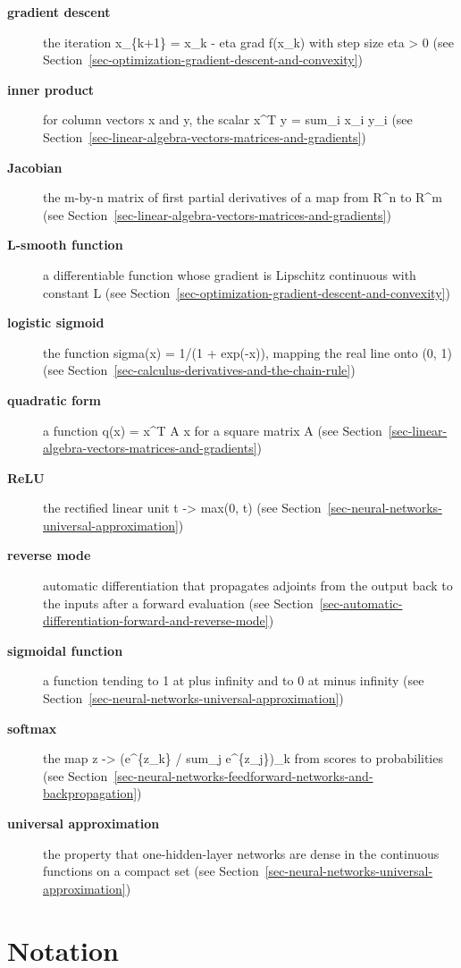 \documentclass[
  english,
  11pt,
  a4paper,
  twoside,
  open=any,
  numbers=noenddot]{scrbook}
\theoremstyle{plain}
\theoremstyle{plain}
\theoremstyle{plain}
\theoremstyle{definition}
\theoremstyle{definition}
\theoremstyle{definition}
\theoremstyle{remark}
\begin{document}
\begin{description}
\item[\textbf{gradient descent}]
the iteration x\_\{k+1\} = x\_k - eta grad f(x\_k) with step size eta
\textgreater{} 0 (see
Section~\ref{sec-optimization-gradient-descent-and-convexity})
\item[\textbf{inner product}]
for column vectors x and y, the scalar x\^{}T y = sum\_i x\_i y\_i (see
Section~\ref{sec-linear-algebra-vectors-matrices-and-gradients})
\item[\textbf{Jacobian}]
the m-by-n matrix of first partial derivatives of a map from R\^{}n to
R\^{}m (see
Section~\ref{sec-linear-algebra-vectors-matrices-and-gradients})
\item[\textbf{L-smooth function}]
a differentiable function whose gradient is Lipschitz continuous with
constant L (see
Section~\ref{sec-optimization-gradient-descent-and-convexity})
\item[\textbf{logistic sigmoid}]
the function sigma(x) = 1/(1 + exp(-x)), mapping the real line onto (0,
1) (see Section~\ref{sec-calculus-derivatives-and-the-chain-rule})
\item[\textbf{quadratic form}]
a function q(x) = x\^{}T A x for a square matrix A (see
Section~\ref{sec-linear-algebra-vectors-matrices-and-gradients})
\item[\textbf{ReLU}]
the rectified linear unit t -\textgreater{} max(0, t) (see
Section~\ref{sec-neural-networks-universal-approximation})
\item[\textbf{reverse mode}]
automatic differentiation that propagates adjoints from the output back
to the inputs after a forward evaluation (see
Section~\ref{sec-automatic-differentiation-forward-and-reverse-mode})
\item[\textbf{sigmoidal function}]
a function tending to 1 at plus infinity and to 0 at minus infinity (see
Section~\ref{sec-neural-networks-universal-approximation})
\item[\textbf{softmax}]
the map z -\textgreater{} (e\^{}\{z\_k\} / sum\_j e\^{}\{z\_j\})\_k from
scores to probabilities (see
Section~\ref{sec-neural-networks-feedforward-networks-and-backpropagation})
\item[\textbf{universal approximation}]
the property that one-hidden-layer networks are dense in the continuous
functions on a compact set (see
Section~\ref{sec-neural-networks-universal-approximation})
\end{description}

\chapter{Notation}\label{sec-notation}
\end{document}
